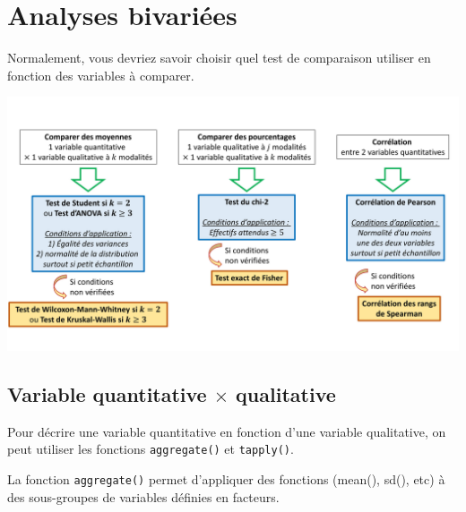 \documentclass[
]{book}
\newenvironment{Shaded}{\begin{snugshade}}{\end{snugshade}}
\newcommand{\AttributeTok}[1]{\textcolor[rgb]{0.13,0.29,0.53}{#1}}
\newcommand{\CommentTok}[1]{\textcolor[rgb]{0.56,0.35,0.01}{\textit{#1}}}
\newcommand{\DocumentationTok}[1]{\textcolor[rgb]{0.56,0.35,0.01}{\textbf{\textit{#1}}}}
\newcommand{\FunctionTok}[1]{\textcolor[rgb]{0.13,0.29,0.53}{\textbf{#1}}}
\newcommand{\NormalTok}[1]{#1}
\newcommand{\SpecialCharTok}[1]{\textcolor[rgb]{0.81,0.36,0.00}{\textbf{#1}}}
\newcommand{\StringTok}[1]{\textcolor[rgb]{0.31,0.60,0.02}{#1}}
\begin{document}
\section{Analyses bivariées}\label{analyses-bivariuxe9es}

Normalement, vous devriez savoir choisir quel test de comparaison utiliser en fonction des variables à comparer.

\begin{center}\includegraphics[width=1\linewidth]{./images/tests_bivaries} \end{center}

\subsection{\texorpdfstring{Variable quantitative \(\times\) qualitative}{Variable quantitative \textbackslash times qualitative}}\label{variable-quantitative-times-qualitative}

Pour décrire une variable quantitative en fonction d'une variable qualitative, on peut utiliser les fonctions \texttt{aggregate()} et \texttt{tapply()}.

La fonction \texttt{aggregate()} permet d'appliquer des fonctions (mean(), sd(), etc) à des sous-groupes de variables définies en facteurs.

\begin{Shaded}
\end{Shaded}
\end{document}

